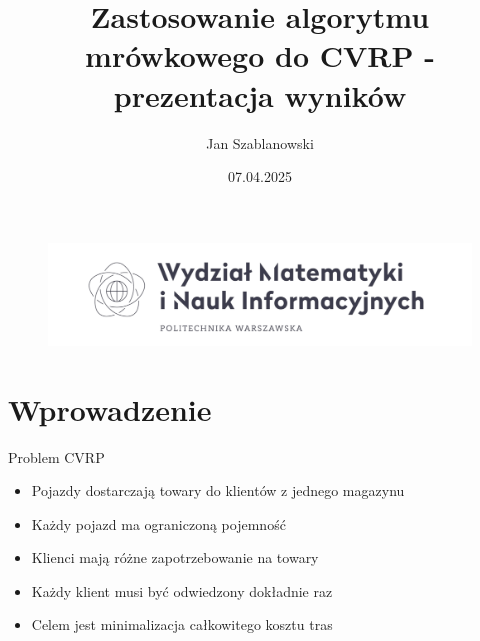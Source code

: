 \documentclass{beamer}
\author{Jan Szablanowski}
\title{Zastosowanie algorytmu mrówkowego do CVRP - prezentacja wyników}
\date{07.04.2025}
\begin{document}
\beamertemplatenavigationsymbolsempty
\begin{frame}[plain]
    \begin{figure}
        \begin{center}
            \includegraphics[width=0.8\linewidth]{img/logo.png}
        \end{center}
    \end{figure}
    \vspace{-4mm}
    \titlepage
\end{frame}


\section*{Wprowadzenie}

\begin{frame}{Problem CVRP}
    \begin{itemize}
        \setlength\itemsep{1em}
        \item Pojazdy dostarczają towary do klientów z jednego magazynu
        \item Każdy pojazd ma ograniczoną pojemność
        \item Klienci mają różne zapotrzebowanie na towary
        \item Każdy klient musi być odwiedzony dokładnie raz
        \item Celem jest minimalizacja całkowitego kosztu tras
    \end{itemize}
\end{frame}
\end{document}
